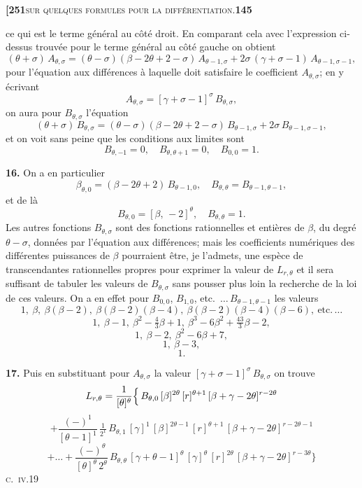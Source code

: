 \documentclass[11pt]{article}
\begin{document}
\newpage

\noindent\textbf{[251}\hfill\textsc{sur quelques formules pour la différentiation.}\hfill\textbf{145}

\medskip

\noindent ce qui est le terme général au côté droit. En comparant cela avec l'expression ci-dessus trouvée pour le terme général au côté gauche on obtient
\[
(\theta + \sigma)\,A_{\theta,\sigma} = (\theta - \sigma)(\beta - 2\theta + 2 - \sigma)\,A_{\theta-1,\sigma} + 2\sigma\,(\gamma + \sigma - 1)\,A_{\theta-1,\sigma-1},
\]
pour l'équation aux différences à laquelle doit satisfaire le coefficient $A_{\theta,\sigma}$; en y écrivant
\[
A_{\theta,\sigma} = [\gamma + \sigma - 1]^{\sigma}\,B_{\theta,\sigma},
\]
on aura pour $B_{\theta,\sigma}$ l'équation
\[
(\theta + \sigma)\,B_{\theta,\sigma} = (\theta - \sigma)(\beta - 2\theta + 2 - \sigma)\,B_{\theta-1,\sigma} + 2\sigma\,B_{\theta-1,\sigma-1},
\]
et on voit sans peine que les conditions aux limites sont
\[
B_{\theta,-1} = 0,\quad B_{\theta,\theta+1} = 0,\quad B_{0,0} = 1.
\]

\medskip

\textbf{16.} On a en particulier
\[
\beta_{\theta,0} = (\beta - 2\theta + 2)\,B_{\theta-1,0},\quad B_{\theta,\theta} = B_{\theta-1,\theta-1},
\]
et de là
\[
B_{\theta,0} = [\beta,\,-2]^{\theta},\quad B_{\theta,\theta} = 1.
\]
Les autres fonctions $B_{\theta,\sigma}$ sont des fonctions rationnelles et entières de $\beta$, du degré $\theta - \sigma$, données par l'équation aux différences; mais les coefficients numériques des différentes puissances de $\beta$ pourraient être, je l'admets, une espèce de transcendantes rationnelles propres pour exprimer la valeur de $L_{r,\theta}$ et il sera suffisant de tabuler les valeurs de $B_{\theta,\sigma}$ sans pousser plus loin la recherche de la loi de ces valeurs. On a en effet pour $B_{0,0}$, $B_{1,0}$, etc.~$\ldots\,B_{\theta-1,\theta-1}$ les valeurs
\[
1,\ \beta,\ \beta(\beta-2),\ \beta(\beta-2)(\beta-4),\ \beta(\beta-2)(\beta-4)(\beta-6),\ \text{etc.}\,\ldots
\]
\[
1,\ \beta - 1,\ \beta^2 - \tfrac{4}{3}\beta + 1,\ \beta^3 - 6\beta^2 + \tfrac{43}{3}\beta - 2,
\]
\[
1,\ \beta - 2,\ \beta^2 - 6\beta + 7,
\]
\[
1,\ \beta - 3,
\]
\[
1.
\]

\medskip

\textbf{17.} Puis en substituant pour $A_{\theta,\sigma}$ la valeur $[\gamma + \sigma - 1]^{\sigma}\,B_{\theta,\sigma}$ on trouve
\[
L_{r,\theta} = \frac{1}{[\theta]^{\theta}}\Bigl\{\, B_{\theta,0}\,[\beta]^{2\theta}\,[r]^{\theta+1}\,[\beta + \gamma - 2\theta]^{r-2\theta}
\]
\[
+ \frac{(-)^{1}}{[\theta - 1]^{1}}\,\tfrac{1}{2^{1}}\,B_{\theta,1}\,[\gamma]^{1}\,[\beta]^{2\theta-1}\,[r]^{\theta+1}\,[\beta + \gamma - 2\theta]^{r-2\theta-1}
\]
\[
+ \ldots + \frac{(-)^{\theta}}{[\theta]^{\theta}\,2^{\theta}}\,B_{\theta,\theta}\,[\gamma + \theta - 1]^{\theta}\,[\gamma]^{\theta}\,[r]^{2\theta}\,[\beta + \gamma - 2\theta]^{r-3\theta}\Bigr\}
\]
\hfill\textsc{c.~iv.}\hfill 19
\end{document}
